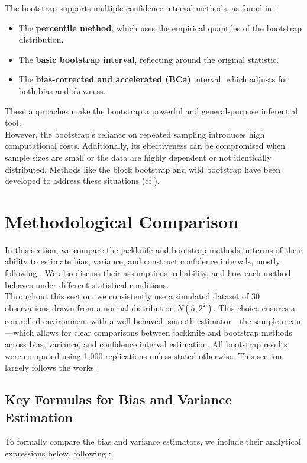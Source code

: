 \documentclass[aodsor,preprint]{imsart}
\numberwithin{equation}{section}
\theoremstyle{plain}
\begin{document}
The bootstrap supports multiple confidence interval methods, as found in \cite{efron1993introduction,davison1997bootstrap}:
\begin{itemize}
  \item The \textbf{percentile method}, which uses the empirical quantiles of the bootstrap distribution.
  \item The \textbf{basic bootstrap interval}, reflecting around the original statistic.
  \item The \textbf{bias-corrected and accelerated (BCa)} interval, which adjusts for both bias and skewness.
\end{itemize}

These approaches make the bootstrap a powerful and general-purpose inferential tool. \\

However, the bootstrap's reliance on repeated sampling introduces high computational costs. Additionally, its effectiveness can be compromised when sample sizes are small or the data are highly dependent or not identically distributed. Methods like the block bootstrap and wild bootstrap have been developed to address these situations (cf \cite{shao1995jackknife,davison1997bootstrap}). \\


\section{Methodological Comparison}

In this section, we compare the jackknife and bootstrap methods in terms of their ability to estimate bias, variance, and construct confidence intervals, mostly following . We also discuss their assumptions, reliability, and how each method behaves under different statistical conditions. \\

Throughout this section, we consistently use a simulated dataset of 30 observations drawn from a normal distribution \( N(5, 2^2) \). This choice ensures a controlled environment with a well-behaved, smooth estimator—the sample mean—which allows for clear comparisons between jackknife and bootstrap methods across bias, variance, and confidence interval estimation. All bootstrap results were computed using 1,000 replications unless stated otherwise. This section largely follows the works \cite{efron1993introduction,shao1995jackknife,davison1997bootstrap}.

\subsection{Key Formulas for Bias and Variance Estimation}
To formally compare the bias and variance estimators, we include their analytical expressions below, following \cite{efron1982jackknife,efron1993introduction,shao1995jackknife}:
 
\end{document}
